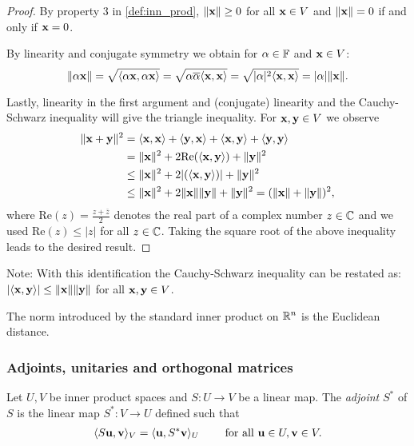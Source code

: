 \documentclass{article}
\begin{document}
\begin{proof}
By property 3 in \cref{def:inn_prod}, $\Vert {\mathbf{x}}\Vert\geq 0$ for all ${\mathbf{x}}\in V$ and $\Vert {\mathbf{x}} \Vert = 0$ if and only if ${\mathbf{x}} = 0$. 

By linearity and conjugate symmetry we obtain for $\alpha \in {\mathbb{F}}$ and ${\mathbf{x}} \in V$: 
\begin{equation*}
    \Vert \alpha {\mathbf{x}} \Vert = \sqrt{\langle \alpha {\mathbf{x}}, \alpha {\mathbf{x}} \rangle} = \sqrt{\alpha \overline{\alpha} \langle {\mathbf{x}},{\mathbf{x}} \rangle} = \sqrt{\vert \alpha\vert^2 \langle {\mathbf{x}},{\mathbf{x}} \rangle} = \vert \alpha \vert \Vert {\mathbf{x}} \Vert.
\end{equation*}

Lastly, linearity in the first argument and (conjugate) linearity and the Cauchy-Schwarz inequality will give the triangle inequality. For ${\mathbf{x}},{\mathbf{y}} \in V$ we observe 
\begin{align*}
    \Vert {\mathbf{x}}+{\mathbf{y}} \Vert^2 &= \langle {\mathbf{x}},{\mathbf{x}} \rangle +\langle {\mathbf{y}},{\mathbf{x}} \rangle +\langle {\mathbf{x}},{\mathbf{y}} \rangle+ \langle {\mathbf{y}},{\mathbf{y}} \rangle\\
    & = \Vert {\mathbf{x}} \Vert^2 + 2\mathrm{Re}(\langle {\mathbf{x}},{\mathbf{y}} \rangle) +  \Vert {\mathbf{y}} \Vert^2 \\
    &\leq \Vert{\mathbf{x}}\Vert^2+ 2\vert(\langle {\mathbf{x}},{\mathbf{y}} \rangle)\vert + \Vert {\mathbf{y}}\Vert^2\\
    & \leq \Vert{\mathbf{x}}\Vert^2+ 2\Vert {\mathbf{x}}\Vert \Vert{\mathbf{y}}\Vert + \Vert {\mathbf{y}}\Vert^2 = (\Vert {\mathbf{x}} \Vert + \Vert {\mathbf{y}} \Vert)^2,
\end{align*}
where $\mathrm{Re}(z) = \frac{z+ \overline{z}}{2}$ denotes the real part of a complex number $z\in {\mathbb{C}}$ and we used $\mathrm{Re}(z) \leq \vert z\vert$ for all $z\in {\mathbb{C}}$. Taking the square root of the above inequality leads to the desired result.
\end{proof}

Note:
With this identification the Cauchy-Schwarz inequality can be restated as: $ \vert \langle {\mathbf{x}},{\mathbf{y}} \rangle\vert \leq \Vert {\mathbf{x}} \Vert \Vert {\mathbf{y}} \Vert$ for all ${\mathbf{x}}, {\mathbf{y}}\in V$.


\begin{example}
The norm introduced by the standard inner product on ${\mathbb{R}}^n$ is the Euclidean distance. 
\end{example}

\subsubsection{Adjoints, unitaries and orthogonal matrices}

\begin{definition}
Let $U,V$ be inner product spaces and $S\colon U \to V$ be a linear map. The \emph{adjoint} $S^*$ of $S$ is the linear map $S^*\colon V \to U$ defined such that 
\begin{align*}
    \langle S{\mathbf{u}},{\mathbf{v}} \rangle_V = \langle {\mathbf{u}},S^*{\mathbf{v}} \rangle_U \qquad \text{ for all } {\mathbf{u}}\in U, {\mathbf{v}}\in V.
\end{align*}
\end{definition}
\end{document}
